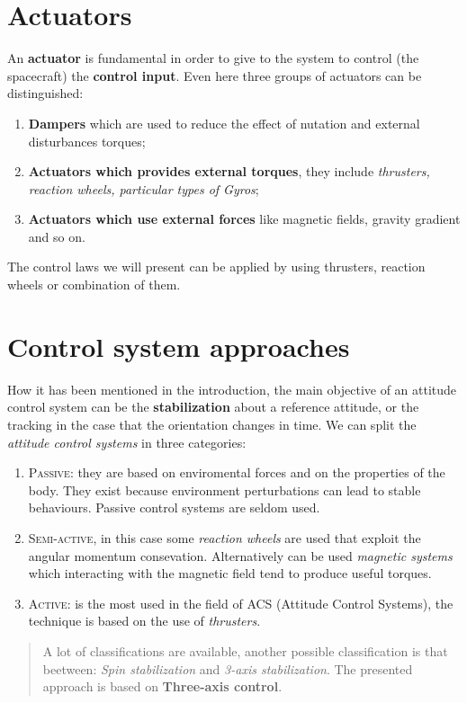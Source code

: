 \section{Actuators}
An \textbf{actuator} is fundamental in order to give to the system to control (the spacecraft) the \textbf{control input}. Even here three groups of actuators can be distinguished:
\begin{enumerate}
    \item \textbf{Dampers} which are used to reduce the effect of nutation and external disturbances torques;
    \item \textbf{Actuators which provides external torques}, they include \textit{thrusters, reaction wheels, particular types of Gyros};
    \item \textbf{Actuators which use external forces} like magnetic fields, gravity gradient and so on.
\end{enumerate}
The control laws we will present can be applied by using thrusters, reaction wheels or combination of them.

\section{Control system approaches}
How it has been mentioned in the introduction, the main objective of an attitude control system can be the \textbf{stabilization} about a reference attitude, or the tracking in the case that the orientation changes in time.
We can split the \textit{attitude control systems} in three categories:
\begin{enumerate}
    \item \textsc{Passive}: they are based on enviromental forces and on the properties of the body. They exist because environment perturbations can lead to stable behaviours. Passive control systems are seldom used.
    \item \textsc{Semi-active}, in this case some \textit{reaction wheels} are used that exploit the angular momentum consevation. Alternatively can be used \textit{magnetic systems} which interacting with the magnetic field tend to produce useful torques.
    \item \textsc{Active}: is the most used in the field of ACS (Attitude Control Systems), the technique is based on the use of \textit{thrusters}.
\end{enumerate}
\begin{quote}
    \textsf{
        A lot of classifications are available, another possible classification is that beetween: \textit{Spin stabilization} and \textit{3-axis stabilization}. The presented approach is based on \textbf{Three-axis control}.
    }
\end{quote}

